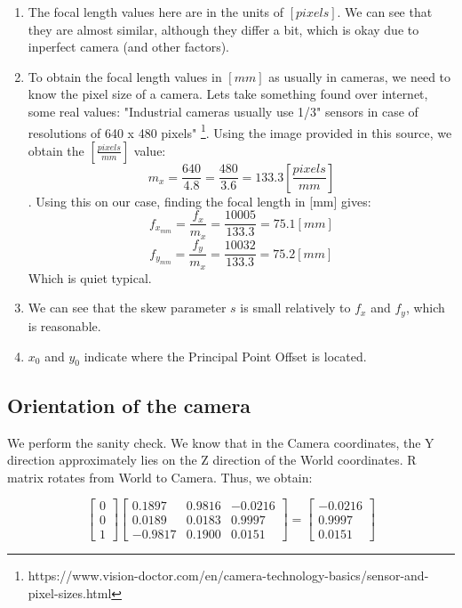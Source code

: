 \documentclass[a4paper]{iacas}
\begin{document}
\begin{enumerate}
\item The focal length values here are in the units of $[pixels]$. We can see that they are almost similar, although they differ a bit, which is okay due to inperfect camera (and other factors).
\item To obtain the focal length values in $[mm]$ as usually in cameras, we need to know the pixel size of a camera. Lets take something found over internet, some real values: "Industrial cameras usually use 1/3" sensors in case of resolutions of 640 x 480 pixels" \footnote{https://www.vision-doctor.com/en/camera-technology-basics/sensor-and-pixel-sizes.html}. Using the image provided in this source, we obtain the $[\frac{pixels}{mm}]$ value: $$m_{x} = \frac{640}{4.8} = \frac{480}{3.6} = 133.3 [\frac{pixels}{mm}]$$.
Using this on our case, finding the focal length in [mm] gives:
$$f_{x_{mm}} = \frac{f_{x}}{m_{x}} = \frac{10005}{133.3} = 75.1 [mm]$$
$$f_{y_{mm}} = \frac{f_{y}}{m_{x}} = \frac{10032}{133.3} = 75.2 [mm]$$
Which is quiet typical. 
\item We can see that the skew parameter $s$ is small relatively to $f_{x}$ and $f_{y}$, which is reasonable.
\item $x_{0}$ and $y_{0}$ indicate where the Principal Point Offset is located.
\end{enumerate}

\subsection{Orientation of the camera}
We perform the sanity check. We know that in the Camera coordinates, the Y direction approximately lies on the Z direction of the World coordinates. R matrix rotates from World to Camera. Thus, we obtain:

\begin{equation*}
\left[
\begin{matrix}
0\\
0 \\
1
\end{matrix}
\right]
\left[
\begin{matrix}
    0.1897  &  0.9816  & -0.0216\\
    0.0189  &  0.0183  &  0.9997\\
   -0.9817  &  0.1900  &  0.0151
\end{matrix}
\right]
= 
\left[
\begin{matrix}
   -0.0216\\
    0.9997\\
    0.0151
\end{matrix}
\right]
\end{equation*}
\end{document}
